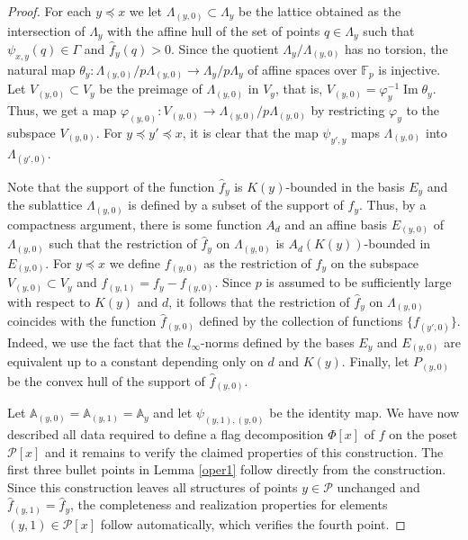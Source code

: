 \documentclass{daj}
\newcommand{\A}{\mathbb A}
\newcommand{\FF}{\mathbb F}
\renewcommand{\P}{\mathcal P}
\theoremstyle{definition}
\theoremstyle{remark}
\theoremstyle{definition}
\theoremstyle{definition}
\begin{document}
\begin{proof}
For each $y\preceq x$ we let $\Lambda_{(y, 0)} \subset \Lambda_y$ be the lattice obtained as the intersection of $\Lambda_y$ with the affine hull of the set of points $q \in \Lambda_y$ such that $\psi_{x, y}(q) \in \Gamma$ and $\hat f_y(q) > 0$. Since the quotient $\Lambda_y / \Lambda_{(y,0)}$ has no torsion, the natural map $\theta_y: \Lambda_{(y, 0)} / p \Lambda_{(y, 0)} \rightarrow \Lambda_y/p\Lambda_y$ of affine spaces over $\FF_p$ is injective. 
Let $V_{(y, 0)} \subset V_y$ be the preimage of $\Lambda_{(y, 0)}$ in $V_y$, that is, $V_{(y, 0)} = \varphi_y^{-1} \operatorname{Im}\theta_y$. Thus, we get a map $\varphi_{(y, 0)}: V_{(y, 0)} \rightarrow \Lambda_{(y, 0)} / p \Lambda_{(y, 0)}$ by restricting $\varphi_y$ to the subspace $V_{(y, 0)}$. For $y \preceq y' \preceq x$, it is clear that the map $\psi_{y', y}$ maps $\Lambda_{(y, 0)}$ into $\Lambda_{(y', 0)}$.

Note that the support of the function $\hat f_y$ is $K(y)$-bounded in the basis $E_y$ and the sublattice $\Lambda_{(y, 0)}$ is defined by a subset of the support of $\hat f_y$. Thus, by a compactness argument, there is some function $A_d$ and an affine basis $E_{(y, 0)}$ of $\Lambda_{(y, 0)}$ such that the restriction of $\hat f_y$ on $\Lambda_{(y, 0)}$ is $A_d(K(y))$-bounded in $E_{(y, 0)}$.
For $y \preceq x$ we define $f_{(y, 0)}$ as the restriction of $f_y$ on the subspace $V_{(y, 0)} \subset V_y$ and $f_{(y, 1)} = f_y - f_{(y, 0)}$. Since $p$ is assumed to be sufficiently large with respect to $K(y)$ and $d$, it follows that the restriction of $\hat f_y$ on $\Lambda_{(y, 0)}$ coincides with the function $\hat f_{(y, 0)}$ defined by the collection of functions $\{f_{(y', 0)}\}$. Indeed, we use the fact that the $l_\infty$-norms defined by the bases $E_y$ and $E_{(y,0)}$ are equivalent up to a constant depending only on $d$ and $K(y)$. Finally, let $P_{(y, 0)}$ be the convex hull of the support of $\hat f_{(y,0)}$.

Let $\A_{(y, 0)} = \A_{(y, 1)} = \A_y$ and let $\psi_{(y, 1), (y, 0)}$ be the identity map. 
We have now described all data required to define a flag decomposition $\Phi[x]$ of $f$ on the poset $\P[x]$ and it remains to verify the claimed properties of this construction. The first three bullet points in Lemma \ref{oper1} follow directly from the construction. 
Since this construction leaves all structures of points $y \in \P$ unchanged and $\hat f_{(y, 1)} = \hat f_{y}$, the completeness and realization properties for elements $(y, 1) \in \P[x]$ follow automatically, which verifies the fourth point.



\end{proof}
\end{document}
